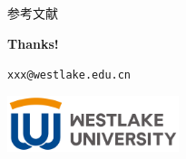 \documentclass[11pt]{beamer}
\makeatletter
\newcommand{\email}{xxx@westlake.edu.cn}
\makeatother
\begin{document}
% 
% 

\begin{frame}[allowframebreaks]{参考文献}
  
  
\end{frame}



\begin{frame}
  \centering
  \vspace{1cm}
  
  {\textbf{Thanks!}}
  
  \vspace{1cm}
  
  \texttt{\email}
  
  \vspace{0.8cm}
  
  \includegraphics[width=5cm]{./pic/logo3.png}
  
\end{frame}

    
\end{document}
